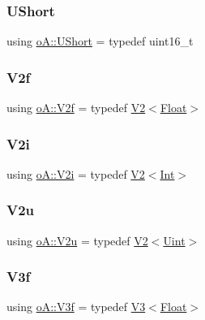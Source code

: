 \subsubsection{\texorpdfstring{U\+Short}{UShort}}
{\footnotesize\ttfamily using \mbox{\hyperlink{namespaceo_a_a0e8a8217ae95045f36575875dcb54537}{o\+A\+::\+U\+Short}} = typedef uint16\+\_\+t}

\mbox{\label{namespaceo_a_a6de6b1704d5ba4ceac954fdebaee0d79}} 
\subsubsection{\texorpdfstring{V2f}{V2f}}
{\footnotesize\ttfamily using \mbox{\hyperlink{namespaceo_a_a6de6b1704d5ba4ceac954fdebaee0d79}{o\+A\+::\+V2f}} = typedef \mbox{\hyperlink{structo_a_1_1_v2}{V2}}$<$\mbox{\hyperlink{namespaceo_a_a513e9cb16924b482268ab3fcdf1f2499}{Float}}$>$}

\mbox{\label{namespaceo_a_aeddbfac9ac1bbff3d9640251439b33aa}} 
\subsubsection{\texorpdfstring{V2i}{V2i}}
{\footnotesize\ttfamily using \mbox{\hyperlink{namespaceo_a_aeddbfac9ac1bbff3d9640251439b33aa}{o\+A\+::\+V2i}} = typedef \mbox{\hyperlink{structo_a_1_1_v2}{V2}}$<$\mbox{\hyperlink{namespaceo_a_aa575525a7b0116822c73d43fa671a58c}{Int}}$>$}

\mbox{\label{namespaceo_a_a20f57c861441be662b592b15a492f29e}} 
\subsubsection{\texorpdfstring{V2u}{V2u}}
{\footnotesize\ttfamily using \mbox{\hyperlink{namespaceo_a_a20f57c861441be662b592b15a492f29e}{o\+A\+::\+V2u}} = typedef \mbox{\hyperlink{structo_a_1_1_v2}{V2}}$<$\mbox{\hyperlink{namespaceo_a_abe1d8250226c5cf34f84d7b75fc7922e}{Uint}}$>$}

\mbox{\label{namespaceo_a_a795c21de788620b8fb6c14bf3046dcf9}} 
\subsubsection{\texorpdfstring{V3f}{V3f}}
{\footnotesize\ttfamily using \mbox{\hyperlink{namespaceo_a_a795c21de788620b8fb6c14bf3046dcf9}{o\+A\+::\+V3f}} = typedef \mbox{\hyperlink{structo_a_1_1_v3}{V3}}$<$\mbox{\hyperlink{namespaceo_a_a513e9cb16924b482268ab3fcdf1f2499}{Float}}$>$}

